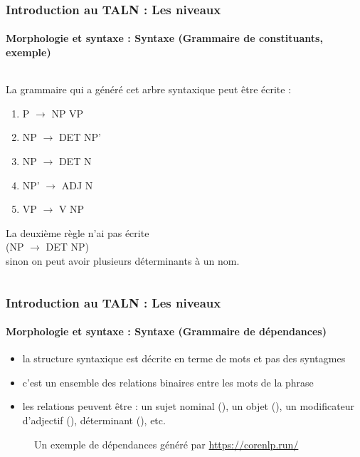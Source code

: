 \documentclass[xcolor=table]{beamer}
\begin{document}
\begin{frame}
\frametitle{Introduction au TALN : Les niveaux}
\framesubtitle{Morphologie et syntaxe : Syntaxe (Grammaire de constituants, exemple)}

\begin{columns}
	\begin{column}{0.52\textwidth}
	La grammaire qui a généré cet arbre syntaxique peut être écrite : 
	
	\begin{enumerate}
		\item P $ \rightarrow $ NP VP
		\item NP $ \rightarrow $ DET NP'
		\item NP $ \rightarrow $ DET N
		\item NP' $ \rightarrow $ ADJ N
		\item VP $ \rightarrow $ V NP
	\end{enumerate}

	La deuxième règle n'ai pas écrite \\(NP $ \rightarrow $ DET NP)\\ sinon on peut avoir plusieurs déterminants à un nom.
	
	\end{column}
	\begin{column}{0.42\textwidth}
	\end{column}%
\end{columns}


\end{frame}

\begin{frame}
\frametitle{Introduction au TALN : Les niveaux}
\framesubtitle{Morphologie et syntaxe : Syntaxe (Grammaire de dépendances)}

\begin{itemize}
	\item la structure syntaxique est décrite en terme de mots et pas des syntagmes
	\item c'est un ensemble des relations binaires entre les mots de la phrase
	\item les relations peuvent être : un sujet nominal (), un objet (), un modificateur d'adjectif (), déterminant (), etc.
\end{itemize}

\begin{figure}
	\caption{Un exemple de dépendances généré par \url{https://corenlp.run/}}
\end{figure}

\end{frame}
\end{document}

